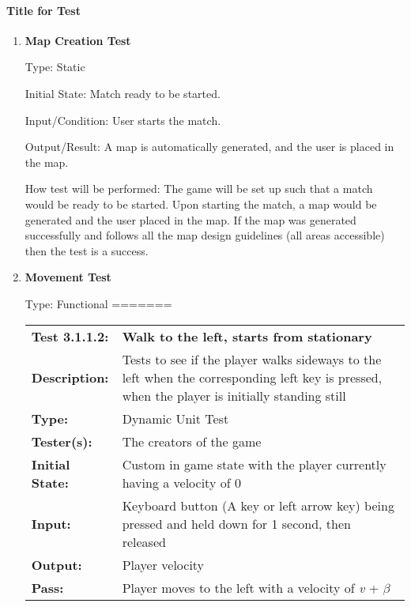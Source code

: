 \documentclass[12pt, titlepage]{article}
\begin{document}
\paragraph{Title for Test}
\begin{enumerate}
\item{}
\textbf{Map Creation Test}

Type: Static
					
Initial State: Match ready to be started.  
					
Input/Condition: User starts the match. 
					
Output/Result: A map is automatically generated, and the user is placed in the map. 
					
How test will be performed: The game will be set up such that a match would be ready to be started. Upon starting the match, a map would be generated and the user placed in the map. If the map was generated successfully and follows all the map design guidelines (all areas accessible) then the test is a success. 
					
\item{}
\textbf{Movement Test}

Type: Functional
=======
					
\begin{mdframed}[linewidth=1pt]
\begin{tabularx}{\textwidth}{@{}p{3cm}X@{}}
{\bf Test 3.1.1.2:} & {\bf Walk to the left, starts from stationary}\\[\baselineskip]
{\bf Description:} & Tests to see if the player walks sideways to the left when the corresponding left key is pressed, when the player is initially standing still\\[0.5\baselineskip]
{\bf Type:} & Dynamic Unit Test\\[0.5\baselineskip]
{\bf Tester(s):} & The creators of the game\\[0.5\baselineskip]
{\bf Initial State:} & Custom in game state with the player currently having a velocity of 0\\[0.5\baselineskip]
{\bf Input:} & Keyboard button (A key or left arrow key) being pressed and held down for 1 second, then released\\[0.5\baselineskip]
{\bf Output:} & Player velocity\\[0.5\baselineskip]
{\bf Pass:} & Player moves to the left with a velocity of \textit{v} + $\beta$
\end{tabularx}
\end{mdframed}


\end{enumerate}
\end{document}
